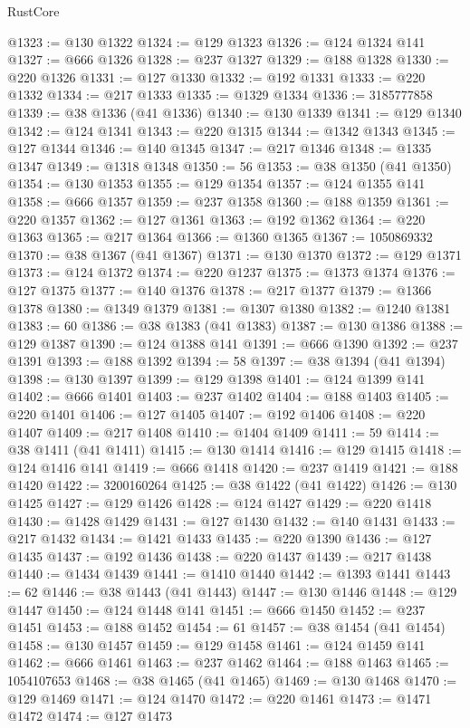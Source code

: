 \begin{lexlean}{RustCore}
\begin{coremodule}
@1323 := @130 @1322
@1324 := @129 @1323
@1326 := @124 @1324 @141
@1327 := @666 @1326
@1328 := @237 @1327
@1329 := @188 @1328
@1330 := @220 @1326
@1331 := @127 @1330
@1332 := @192 @1331
@1333 := @220 @1332
@1334 := @217 @1333
@1335 := @1329 @1334
@1336 := 3185777858
@1339 := @38 @1336 (@41 @1336)
@1340 := @130 @1339
@1341 := @129 @1340
@1342 := @124 @1341
@1343 := @220 @1315
@1344 := @1342 @1343
@1345 := @127 @1344
@1346 := @140 @1345
@1347 := @217 @1346
@1348 := @1335 @1347
@1349 := @1318 @1348
@1350 := 56
@1353 := @38 @1350 (@41 @1350)
@1354 := @130 @1353
@1355 := @129 @1354
@1357 := @124 @1355 @141
@1358 := @666 @1357
@1359 := @237 @1358
@1360 := @188 @1359
@1361 := @220 @1357
@1362 := @127 @1361
@1363 := @192 @1362
@1364 := @220 @1363
@1365 := @217 @1364
@1366 := @1360 @1365
@1367 := 1050869332
@1370 := @38 @1367 (@41 @1367)
@1371 := @130 @1370
@1372 := @129 @1371
@1373 := @124 @1372
@1374 := @220 @1237
@1375 := @1373 @1374
@1376 := @127 @1375
@1377 := @140 @1376
@1378 := @217 @1377
@1379 := @1366 @1378
@1380 := @1349 @1379
@1381 := @1307 @1380
@1382 := @1240 @1381
@1383 := 60
@1386 := @38 @1383 (@41 @1383)
@1387 := @130 @1386
@1388 := @129 @1387
@1390 := @124 @1388 @141
@1391 := @666 @1390
@1392 := @237 @1391
@1393 := @188 @1392
@1394 := 58
@1397 := @38 @1394 (@41 @1394)
@1398 := @130 @1397
@1399 := @129 @1398
@1401 := @124 @1399 @141
@1402 := @666 @1401
@1403 := @237 @1402
@1404 := @188 @1403
@1405 := @220 @1401
@1406 := @127 @1405
@1407 := @192 @1406
@1408 := @220 @1407
@1409 := @217 @1408
@1410 := @1404 @1409
@1411 := 59
@1414 := @38 @1411 (@41 @1411)
@1415 := @130 @1414
@1416 := @129 @1415
@1418 := @124 @1416 @141
@1419 := @666 @1418
@1420 := @237 @1419
@1421 := @188 @1420
@1422 := 3200160264
@1425 := @38 @1422 (@41 @1422)
@1426 := @130 @1425
@1427 := @129 @1426
@1428 := @124 @1427
@1429 := @220 @1418
@1430 := @1428 @1429
@1431 := @127 @1430
@1432 := @140 @1431
@1433 := @217 @1432
@1434 := @1421 @1433
@1435 := @220 @1390
@1436 := @127 @1435
@1437 := @192 @1436
@1438 := @220 @1437
@1439 := @217 @1438
@1440 := @1434 @1439
@1441 := @1410 @1440
@1442 := @1393 @1441
@1443 := 62
@1446 := @38 @1443 (@41 @1443)
@1447 := @130 @1446
@1448 := @129 @1447
@1450 := @124 @1448 @141
@1451 := @666 @1450
@1452 := @237 @1451
@1453 := @188 @1452
@1454 := 61
@1457 := @38 @1454 (@41 @1454)
@1458 := @130 @1457
@1459 := @129 @1458
@1461 := @124 @1459 @141
@1462 := @666 @1461
@1463 := @237 @1462
@1464 := @188 @1463
@1465 := 1054107653
@1468 := @38 @1465 (@41 @1465)
@1469 := @130 @1468
@1470 := @129 @1469
@1471 := @124 @1470
@1472 := @220 @1461
@1473 := @1471 @1472
@1474 := @127 @1473

\end{coremodule}
\end{lexlean}
